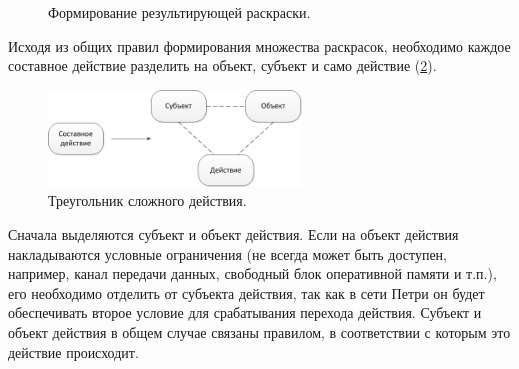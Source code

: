 \begin{figure}
	\begin{minipage}[H]{0.8\linewidth}
		\caption{Формирование результирующей раскраски.}
		\label{fig:fig19}
	\end{minipage}	
\end{figure}

Исходя из общих правил формирования множества раскрасок, необходимо каждое составное действие разделить на объект, субъект и само действие (\ref{fig:fig9}).

\begin{figure}
	\begin{center}
		\includegraphics[width=0.6\textwidth]{include/CompositeActivity.png}
	\end{center}
	\caption{Треугольник сложного действия.}
	\label{fig:fig9}
\end{figure}

Сначала выделяются субъект и объект действия. Если на объект действия накладываются условные ограничения (не всегда может быть доступен, например, канал передачи данных, свободный блок оперативной памяти и т.п.), его необходимо отделить от субъекта действия, так как в сети Петри он будет обеспечивать второе условие для срабатывания перехода действия. Субъект и объект действия в общем случае связаны правилом, в соответствии с которым это действие происходит. \cite{Korotkov} 

